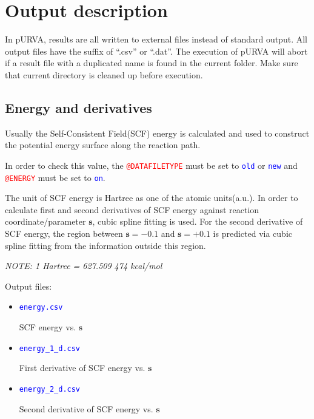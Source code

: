 
\chapter{Output description}

In pURVA, results are all written to external files instead of standard output. All output files have the suffix of ``.csv'' or ``.dat''. The execution of pURVA will abort if a result file with a duplicated name is found in the current folder. Make sure that current directory is cleaned up before execution.


\section{Energy and derivatives}

Usually the Self-Consistent Field(SCF) energy is calculated and used to construct the potential energy surface along the reaction path.

In order to check this value, the \texttt{\textcolor{red}{@DATAFILETYPE}} must be set to \texttt{\textcolor{blue}{old}} or \texttt{\textcolor{blue}{new}} and \texttt{\textcolor{red}{@ENERGY}} must be set to \texttt{\textcolor{blue}{on}}.

The unit of SCF energy is Hartree as one of the atomic units(a.u.). In order to calculate first and second derivatives of SCF energy against reaction coordinate/parameter $\mathbf{s}$, cubic spline fitting is used. For the second derivative of SCF energy, the region between $\mathbf{s}=-0.1$ and $\mathbf{s}=+0.1$ is predicted via cubic spline fitting from the information outside this region.

\textit{NOTE: 1 Hartree = 627.509 474 kcal/mol}

Output files:
\begin{itemize}
    \item \texttt{\textcolor{blue}{energy.csv}}
    
    SCF energy vs. $\mathbf{s}$
    
    \item \texttt{\textcolor{blue}{energy\_1\_d.csv}}
    
    First derivative of SCF energy vs. $\mathbf{s}$
    
    \item \texttt{\textcolor{blue}{energy\_2\_d.csv}}    
    
    Second derivative of SCF energy vs. $\mathbf{s}$    
    
\end{itemize}



